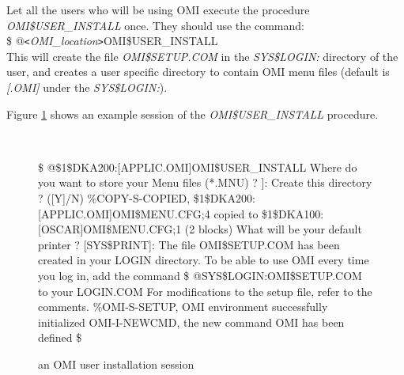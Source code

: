\documentclass[a4paper]{book}
\newcommand{\vs}{\vspace{3mm}}
\newcommand{\lt}{\texttt{<}}
\newcommand{\gt}{\texttt{>}}
\renewcommand{\indent}{\hspace*{5mm}}
\begin{document}
Let all the users who will be using OMI execute the procedure
\linebreak\textsl{OMI{\$}USER{\_}INSTALL} once. They should use the command: \\
\indent\textsf{{\$} @\lt\textit{OMI{\_}location}\gt OMI{\$}USER{\_}INSTALL} \\
This will create the file \textsl{OMI{\$}SETUP.COM} in the \textsl{SYS{\$}LOGIN:} directory of 
the user, and creates a user specific directory to contain OMI menu files 
(default is \textsl{[.OMI]} under the \textsl{SYS{\$}LOGIN:}).

Figure \ref{fig:userinst} shows an example session of the \textsl{OMI{\$}USER{\_}INSTALL}
procedure.

\vs

\begin{figure}[h!tb]
\begin{minipage}[h!tb]{\textwidth}
\hrulefill \\
\begin{ttfamily}\begin{small}
{\$} @{\$}1{\$}DKA200:[APPLIC.OMI]OMI{\$}USER{\_}INSTALL \newline
Where do you want to store your Menu files (*.MNU) ? \newline
[{\$}1{\$}DKA100:[OSCAR.OMI]]: \newline
Create this directory ? ([Y]/N) \newline
{\%}COPY-S-COPIED, {\$}1{\$}DKA200:[APPLIC.OMI]OMI{\$}MENU.CFG;4 copied to {\$}1{\$}DKA100:[OSCAR]OMI{\$}MENU.CFG;1 (2 blocks) \newline
What will be your default printer ? [SYS{\$}PRINT]:\newline
The file OMI{\$}SETUP.COM has been created in your LOGIN directory. \newline
To be able to use OMI every time you log in, add the command \newline
{\$} @SYS{\$}LOGIN:OMI{\$}SETUP.COM \newline
to your LOGIN.COM \newline
For modifications to the setup file, refer to the comments.\newline
{\%}OMI-S-SETUP, OMI environment successfully initialized \newline
OMI-I-NEWCMD, the new command OMI has been defined \newline
{\$}
\end{small}\end{ttfamily}
\caption{an OMI user installation session}\label{fig:userinst}
\hrulefill
\end{minipage}
\end{figure}
\end{document}
